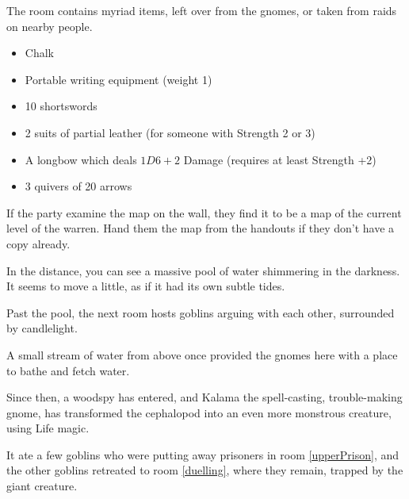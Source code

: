 \begin{multicols}{2}
\begin{boxtext}
\end{boxtext}


The room contains myriad items, left over from the gnomes, or taken from raids on nearby people.

\begin{itemize}
  \item
  Chalk
  \item
  Portable writing equipment (\gls{weight} 1)
  \item
  10 shortswords
  \item
  2 suits of partial leather (for someone with Strength 2 or 3)
    \iftoggle{hardcore}{%
    \item
    1 suit of partial leather (for someone with Strength 1 or 2)
  }{
    \item
    2 suits of partial chain (for someone with Strength 1 or 2)
  }
  \item
  A longbow which deals $1D6+2$ Damage (requires at least Strength +2)
  \item
  3 quivers of 20 arrows
\end{itemize}

If the party examine the map on the wall, they find it to be a map of the current level of the warren.
Hand them the map from the handouts if they don't have a copy already.

\begin{boxtext}

  In the distance, you can see a massive pool of water shimmering in the darkness.
  It seems to move a little, as if it had its own subtle tides.

  Past the pool, the next room hosts goblins arguing with each other, surrounded by candlelight.

\end{boxtext}


\begin{exampletext}

  A small stream of water from above once provided the gnomes here with a place to bathe and fetch water.

  Since then, a woodspy has entered, and Kalama the spell-casting, trouble-making gnome, has transformed the cephalopod into an even more monstrous creature, using Life magic.

  It ate a few goblins who were putting away prisoners in room \ref{upperPrison}, and the other goblins retreated to room \ref{duelling}, where they remain, trapped by the giant creature.


\end{exampletext}
\end{multicols}
